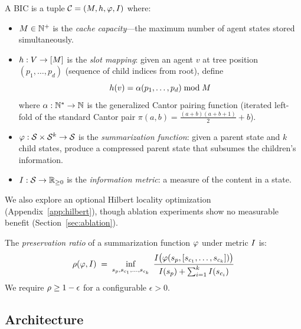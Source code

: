 \begin{definition}
\label{def:bic}
A BIC is a tuple $\mathcal{C} = (M, h, \varphi, I)$ where:
\begin{itemize}
  \item $M \in \mathbb{N}^+$ is the \emph{cache capacity}---the maximum
        number of agent states stored simultaneously.
  \item $h: V \to [M]$ is the \emph{slot mapping}: given an agent
        $v$ at tree position $(p_1, \dots, p_d)$ (sequence of child
        indices from root), define
        \begin{equation}
          h(v) = \alpha(p_1, \dots, p_d) \bmod M
          \label{eq:slot}
        \end{equation}
        where $\alpha: \mathbb{N}^* \to \mathbb{N}$ is the generalized Cantor
        pairing function (iterated left-fold of the standard Cantor
        pair $\pi(a,b) = \frac{(a+b)(a+b+1)}{2} + b$).
  \item $\varphi: \mathcal{S} \times \mathcal{S}^k \to \mathcal{S}$ is the
        \emph{summarization function}: given a parent state and $k$
        child states, produce a compressed parent state that subsumes
        the children's information.
  \item $I: \mathcal{S} \to \mathbb{R}_{\geq 0}$ is the \emph{information
        metric}: a measure of the content in a state.
\end{itemize}
\end{definition}

We also explore an optional Hilbert locality optimization (Appendix~\ref{app:hilbert}), though ablation experiments show no measurable benefit (Section~\ref{sec:ablation}).

\begin{definition}
\label{def:preservation}
The \emph{preservation ratio} of a summarization function $\varphi$
under metric $I$ is:
\begin{equation}
  \rho(\varphi, I) \;=\;
  \inf_{s_p, s_{c_1}, \dots, s_{c_k}} \;
  \frac{I\bigl(\varphi(s_p, [s_{c_1}, \dots, s_{c_k}])\bigr)}
       {I(s_p) + \sum_{i=1}^{k} I(s_{c_i})}
  \label{eq:preservation}
\end{equation}
We require $\rho \geq 1 - \epsilon$ for a configurable $\epsilon > 0$.
\end{definition}


\subsection{Architecture}
\label{sec:architecture}


